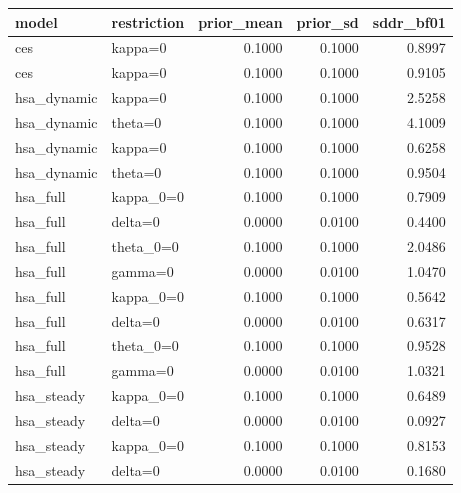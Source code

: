 \begin{tabular}{llrrr}
\toprule
model & restriction & prior\_mean & prior\_sd & sddr\_bf01 \\
\midrule
ces & kappa=0 & 0.1000 & 0.1000 & 0.8997 \\
ces & kappa=0 & 0.1000 & 0.1000 & 0.9105 \\
hsa\_dynamic & kappa=0 & 0.1000 & 0.1000 & 2.5258 \\
hsa\_dynamic & theta=0 & 0.1000 & 0.1000 & 4.1009 \\
hsa\_dynamic & kappa=0 & 0.1000 & 0.1000 & 0.6258 \\
hsa\_dynamic & theta=0 & 0.1000 & 0.1000 & 0.9504 \\
hsa\_full & kappa\_0=0 & 0.1000 & 0.1000 & 0.7909 \\
hsa\_full & delta=0 & 0.0000 & 0.0100 & 0.4400 \\
hsa\_full & theta\_0=0 & 0.1000 & 0.1000 & 2.0486 \\
hsa\_full & gamma=0 & 0.0000 & 0.0100 & 1.0470 \\
hsa\_full & kappa\_0=0 & 0.1000 & 0.1000 & 0.5642 \\
hsa\_full & delta=0 & 0.0000 & 0.0100 & 0.6317 \\
hsa\_full & theta\_0=0 & 0.1000 & 0.1000 & 0.9528 \\
hsa\_full & gamma=0 & 0.0000 & 0.0100 & 1.0321 \\
hsa\_steady & kappa\_0=0 & 0.1000 & 0.1000 & 0.6489 \\
hsa\_steady & delta=0 & 0.0000 & 0.0100 & 0.0927 \\
hsa\_steady & kappa\_0=0 & 0.1000 & 0.1000 & 0.8153 \\
hsa\_steady & delta=0 & 0.0000 & 0.0100 & 0.1680 \\
\bottomrule
\end{tabular}
